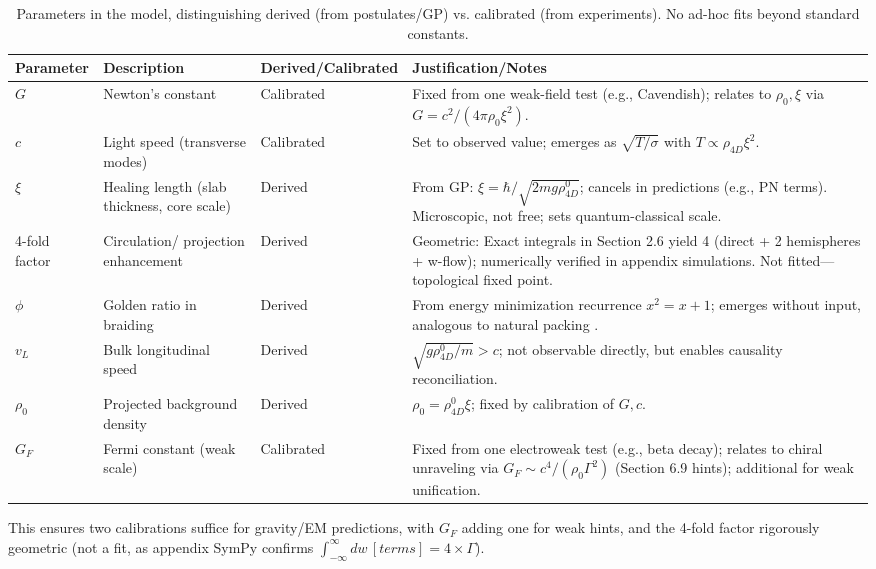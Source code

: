 \begin{table}[H]
\centering
\small
\begin{tabularx}{\linewidth}{|p{1.5cm}|p{2cm}|l|Y|}
\hline
Parameter & Description & Derived/Calibrated & Justification/Notes \\
\hline
\(G\) & Newton's constant & Calibrated & Fixed from one weak-field test (e.g., Cavendish); relates to \(\rho_0, \xi\) via \(G = c^2 / (4\pi \rho_0 \xi^2)\). \\
\hline
\(c\) & Light speed (transverse modes) & Calibrated & Set to observed value; emerges as \(\sqrt{T / \sigma}\) with \(T \propto \rho_{4D} \xi^2\). \\
\hline
\(\xi\) & Healing length (slab thickness, core scale) & Derived & From GP: \(\xi = \hbar / \sqrt{2 m g \rho_{4D}^0}\); cancels in predictions (e.g., PN terms). Microscopic, not free; sets quantum-classical scale. \\
-fold factor & Circulation/ projection enhancement & Derived & Geometric: Exact integrals in Section 2.6 yield 4 (direct + 2 hemispheres + w-flow); numerically verified in appendix simulations. Not fitted—topological fixed point. \\
\hline
\(\phi\) & Golden ratio in braiding & Derived & From energy minimization recurrence \(x^2 = x + 1\); emerges without input, analogous to natural packing \cite{svancara2024rotating}. \\
\hline
\(v_L\) & Bulk longitudinal speed & Derived & \(\sqrt{g \rho_{4D}^0 / m} > c\); not observable directly, but enables causality reconciliation. \\
\hline
\(\rho_0\) & Projected background density & Derived & \(\rho_0 = \rho_{4D}^0 \xi\); fixed by calibration of \(G, c\). \\
\hline
\(G_F\) & Fermi constant (weak scale) & Calibrated & Fixed from one electroweak test (e.g., beta decay); relates to chiral unraveling via \(G_F \sim c^4 / (\rho_0 \Gamma^2)\) (Section 6.9 hints); additional for weak unification. \\
\hline
\end{tabularx}
\caption{Parameters in the model, distinguishing derived (from postulates/GP) vs. calibrated (from experiments). No ad-hoc fits beyond standard constants.}
\label{tab:parameters}
\end{table}

This ensures two calibrations suffice for gravity/EM predictions, with \(G_F\) adding one for weak hints, and the 4-fold factor rigorously geometric (not a fit, as appendix SymPy confirms \(\int_{-\infty}^\infty dw \, [terms] = 4 \times \Gamma\)).

